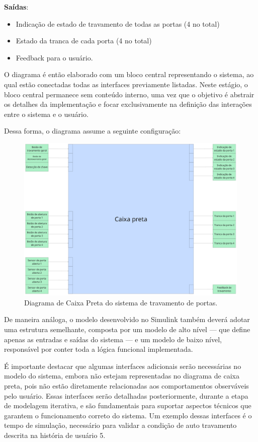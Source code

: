\textbf{Saídas}:

\begin{itemize}
    \item Indicação de estado de travamento de todas as portas (4 no total)
    \item Estado da tranca de cada porta (4 no total)
    \item Feedback para o usuário.
\end{itemize}

O diagrama é então elaborado com um bloco central representando o sistema, ao qual estão conectadas todas as interfaces previamente listadas. Neste estágio, 
o bloco central permanece sem conteúdo interno, uma vez que o objetivo é abstrair os detalhes da implementação e focar exclusivamente na definição das 
interações entre o sistema e o usuário.

Dessa forma, o diagrama assume a seguinte configuração:

\begin{figure}[H]
\centering
\includegraphics[height=8cm]{figuras/diagrama_caixa_preta.png}
\caption{Diagrama de Caixa Preta do sistema de travamento de portas.}
\end{figure}

De maneira análoga, o modelo desenvolvido no Simulink também deverá adotar uma estrutura semelhante, composta por um modelo de alto nível — que define apenas as 
entradas e saídas do sistema — e um modelo de baixo nível, responsável por conter toda a lógica funcional implementada.

É importante destacar que algumas interfaces adicionais serão necessárias no modelo do sistema, embora não estejam representadas no diagrama de caixa preta, 
pois não estão diretamente relacionadas aos comportamentos observáveis pelo usuário. Essas interfaces serão detalhadas posteriormente, durante a etapa de 
modelagem iterativa, e são fundamentais para suportar aspectos técnicos que garantem o funcionamento correto do sistema. Um exemplo dessas interfaces é o tempo 
de simulação, necessário para validar a condição de auto travamento descrita na história de usuário 5.

